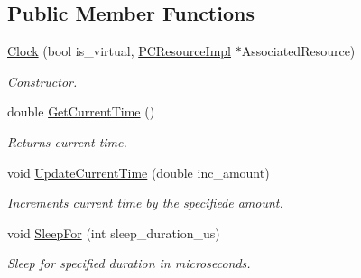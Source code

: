 \subsection*{Public Member Functions}
\begin{DoxyCompactItemize}
\item 
\hyperlink{classpc__emulator_1_1Clock_a512ea6e88d7df5ac3658cfb7e2206a3b}{Clock} (bool is\+\_\+virtual, \hyperlink{classpc__emulator_1_1PCResourceImpl}{P\+C\+Resource\+Impl} $\ast$Associated\+Resource)\hypertarget{classpc__emulator_1_1Clock_a512ea6e88d7df5ac3658cfb7e2206a3b}{}\label{classpc__emulator_1_1Clock_a512ea6e88d7df5ac3658cfb7e2206a3b}

\begin{DoxyCompactList}\small\item\em Constructor. \end{DoxyCompactList}\item 
double \hyperlink{classpc__emulator_1_1Clock_a17eec248287f3b57b699eea5b5a8e43f}{Get\+Current\+Time} ()\hypertarget{classpc__emulator_1_1Clock_a17eec248287f3b57b699eea5b5a8e43f}{}\label{classpc__emulator_1_1Clock_a17eec248287f3b57b699eea5b5a8e43f}

\begin{DoxyCompactList}\small\item\em Returns current time. \end{DoxyCompactList}\item 
void \hyperlink{classpc__emulator_1_1Clock_a4c54d7f36d90db5ddae81fca94d835c9}{Update\+Current\+Time} (double inc\+\_\+amount)\hypertarget{classpc__emulator_1_1Clock_a4c54d7f36d90db5ddae81fca94d835c9}{}\label{classpc__emulator_1_1Clock_a4c54d7f36d90db5ddae81fca94d835c9}

\begin{DoxyCompactList}\small\item\em Increments current time by the specifiede amount. \end{DoxyCompactList}\item 
void \hyperlink{classpc__emulator_1_1Clock_afab6f601e53dab4ef79792e4e57d5247}{Sleep\+For} (int sleep\+\_\+duration\+\_\+us)\hypertarget{classpc__emulator_1_1Clock_afab6f601e53dab4ef79792e4e57d5247}{}\label{classpc__emulator_1_1Clock_afab6f601e53dab4ef79792e4e57d5247}

\begin{DoxyCompactList}\small\item\em Sleep for specified duration in microseconds. \end{DoxyCompactList}\end{DoxyCompactItemize}
